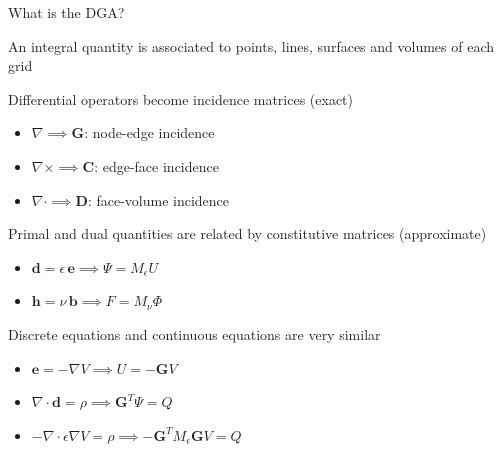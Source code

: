 \documentclass{beamer}
\begin{document}
\begin{frame}{What is the DGA?}
\begin{minipage}{0.45\textwidth}
\begin{center}
    \end{center}
{\scriptsize An integral quantity is associated to points, lines, surfaces and volumes of each grid}
\end{minipage}
\hfill
\begin{minipage}{0.53\textwidth}
        \scriptsize
        \pause
        Differential operators become incidence matrices (exact)
        \begin{itemize}
            \item $\nabla \implies \mathbf{G}$: node-edge incidence
            \item $\nabla\times \implies \mathbf{C}$: edge-face incidence
            \item $\nabla\cdot \implies \mathbf{D}$: face-volume incidence
        \end{itemize}

        \vspace{1mm}

        \pause
        Primal and dual quantities are related by constitutive matrices (approximate)
        \begin{itemize}
            \item $\mathbf{d} = \epsilon\,\mathbf{e} \implies \Psi = M_{\epsilon} U$ 
            \item $\mathbf{h} = \nu\,\mathbf{b} \implies F = M_{\nu} \Phi$ 
        \end{itemize}
        
        \vspace{1mm}

        \pause
        Discrete equations and continuous equations are very similar
        \begin{itemize}
            \item $\mathbf{e} = -\nabla V \implies U = -\mathbf{G}V$
            \item $\nabla\cdot\mathbf{d} = \rho \implies \mathbf{G}^T\Psi = Q$
            \item $-\nabla\cdot\epsilon\nabla V = \rho \implies -\mathbf{G}^T M_{\epsilon}\mathbf{G}V = Q$
        \end{itemize}

\end{minipage}




\end{frame}
\end{document}
